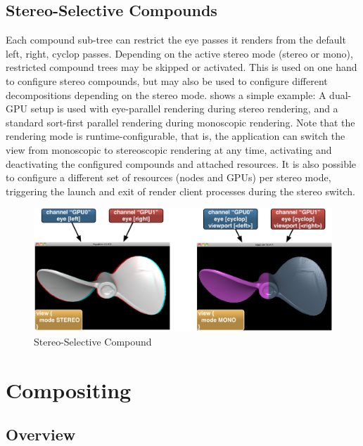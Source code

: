 \section{Stereo-Selective Compounds}

Each compound sub-tree can restrict the eye passes it renders from the default
left, right, cyclop passes. Depending on the active stereo mode (stereo or
mono), restricted compound trees may be skipped or activated. This is used on
one hand to configure stereo compounds, but may also be used to configure
different decompositions depending on the stereo mode.  shows
a simple example: A dual-GPU setup is used with eye-parallel rendering during
stereo rendering, and a standard sort-first parallel rendering during monoscopic
rendering. Note that the rendering mode is runtime-configurable, that is, the
application can switch the view from monoscopic to stereoscopic rendering at any
time, activating and deactivating the configured compounds and attached
resources. It is also possible to configure a different set of resources (nodes
and GPUs) per stereo mode, triggering the launch and exit of render client
processes during the stereo switch.

\begin{figure}[h!t]\center
 \includegraphics[width=\columnwidth]{images/stereoSwitch}
 {\caption{\label{fStereoSwitch}Stereo-Selective Compound}}
\end{figure}

\chapter{Compositing}\label{sCompositing}

\section{Overview}

